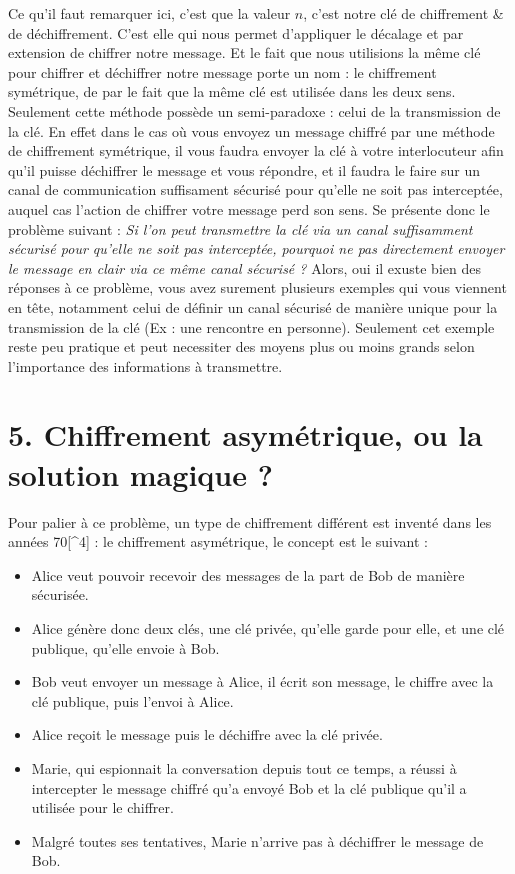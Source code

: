 \documentclass[
  paper=a4,
  ,captions=tableheading
]{scrartcl}
\providecommand{\tightlist}{%
  \setlength{\itemsep}{0pt}\setlength{\parskip}{0pt}}
\begin{document}
Ce qu'il faut remarquer ici, c'est que la valeur \(n\), c'est notre clé
de chiffrement \& de déchiffrement. C'est elle qui nous permet
d'appliquer le décalage et par extension de chiffrer notre message. Et
le fait que nous utilisions la même clé pour chiffrer et déchiffrer
notre message porte un nom : le chiffrement symétrique, de par le fait
que la même clé est utilisée dans les deux sens. Seulement cette méthode
possède un semi-paradoxe : celui de la transmission de la clé. En effet
dans le cas où vous envoyez un message chiffré par une méthode de
chiffrement symétrique, il vous faudra envoyer la clé à votre
interlocuteur afin qu'il puisse déchiffrer le message et vous répondre,
et il faudra le faire sur un canal de communication suffisament sécurisé
pour qu'elle ne soit pas interceptée, auquel cas l'action de chiffrer
votre message perd son sens. Se présente donc le problème suivant :
\emph{Si l'on peut transmettre la clé via un canal suffisamment sécurisé
pour qu'elle ne soit pas interceptée, pourquoi ne pas directement
envoyer le message en clair via ce même canal sécurisé ?} Alors, oui il
exuste bien des réponses à ce problème, vous avez surement plusieurs
exemples qui vous viennent en tête, notamment celui de définir un canal
sécurisé de manière unique pour la transmission de la clé (Ex : une
rencontre en personne). Seulement cet exemple reste peu pratique et peut
necessiter des moyens plus ou moins grands selon l'importance des
informations à transmettre.

\section{5. Chiffrement asymétrique, ou la solution magique
?}\label{chiffrement-asymuxe9trique-ou-la-solution-magique}

Pour palier à ce problème, un type de chiffrement différent est inventé
dans les années 70{[}\^{}4{]} : le chiffrement asymétrique, le concept
est le suivant :

\begin{itemize}
\tightlist
\item
  Alice veut pouvoir recevoir des messages de la part de Bob de manière
  sécurisée.
\item
  Alice génère donc deux clés, une clé privée, qu'elle garde pour elle,
  et une clé publique, qu'elle envoie à Bob.
\item
  Bob veut envoyer un message à Alice, il écrit son message, le chiffre
  avec la clé publique, puis l'envoi à Alice.
\item
  Alice reçoit le message puis le déchiffre avec la clé privée.
\item
  Marie, qui espionnait la conversation depuis tout ce temps, a réussi à
  intercepter le message chiffré qu'a envoyé Bob et la clé publique
  qu'il a utilisée pour le chiffrer.
\item
  Malgré toutes ses tentatives, Marie n'arrive pas à déchiffrer le
  message de Bob.
\end{itemize}
\end{document}
